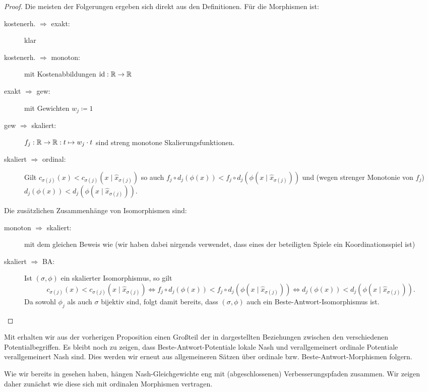 \begin{proof}
	Die meisten der Folgerungen ergeben sich direkt aus den Definitionen. Für die Morphismen ist:
	\begin{description}
		\item[kostenerh. $\bm{\Rightarrow}$ exakt:] klar
		\item[kostenerh. $\bm{\Rightarrow}$ monoton:] mit Kostenabbildungen $\mathrm{id}: \mathbb{R} \to \mathbb{R}$
		\item[exakt $\bm{\Rightarrow}$ gew:] mit Gewichten $w_j \coloneqq 1$
		\item[gew $\bm{\Rightarrow}$ skaliert:] $f_j: \mathbb{R} \to \mathbb{R}: t \mapsto w_j \cdot t$ sind streng monotone Skalierungsfunktionen.
		\item[skaliert $\bm{\Rightarrow}$ ordinal:] Gilt $c_{\sigma(j)}(x) < c_{\sigma(j)}(x \mid \hat{x}_{\sigma(j)})$ so auch $f_j \circ d_j(\phi(x)) < f_j \circ d_j(\phi(x \mid \hat{x}_{\sigma(j)}))$ und (wegen strenger Monotonie von $f_j$) $d_j(\phi(x)) < d_j(\phi(x \mid \hat{x}_{\sigma(j)}))$.
	\end{description}
	Die zusätzlichen Zusammenhänge von Isomorphismen sind:
	\begin{description}
		\item[monoton $\bm{\Rightarrow}$ skaliert:] mit dem gleichen Beweis wie  (wir haben dabei nirgends verwendet, dass eines der beteiligten Spiele ein Koordinationsspiel ist)
		\item[skaliert $\bm{\Rightarrow}$ BA:] Ist $(\sigma, \phi)$ ein skalierter Isomorphismus, so gilt 
			\[c_{\sigma(j)}(x) < c_{\sigma(j)}(x \mid \hat{x}_{\sigma(j)}) \iff f_j \circ d_j(\phi(x)) < f_j \circ d_j(\phi(x \mid \hat{x}_{\sigma(j)})) \iff d_j(\phi(x)) < d_j(\phi(x \mid \hat{x}_{\sigma(j)})).\]
		Da sowohl $\phi_j$ als auch $\sigma$ bijektiv sind, folgt damit bereits, dass $(\sigma, \phi)$ auch ein Beste-Antwort-Isomorphismus ist. \qedhere
	\end{description}	
\end{proof}

Mit  erhalten wir aus der vorherigen Proposition einen Großteil der in  dargestellten Beziehungen zwischen den verschiedenen Potentialbegriffen. Es bleibt noch zu zeigen, dass Beste-Antwort-Potentiale lokale Nash und verallgemeinert ordinale Potentiale verallgemeinert Nash sind. Dies werden wir erneut aus allgemeineren Sätzen über ordinale bzw. Beste-Antwort-Morphismen folgern.

Wie wir bereits in  gesehen haben, hängen Nash-Gleichgewichte eng mit (abgeschlossenen) Verbesserungspfaden zusammen. Wir zeigen daher zunächst wie diese sich mit ordinalen Morphismen vertragen.

